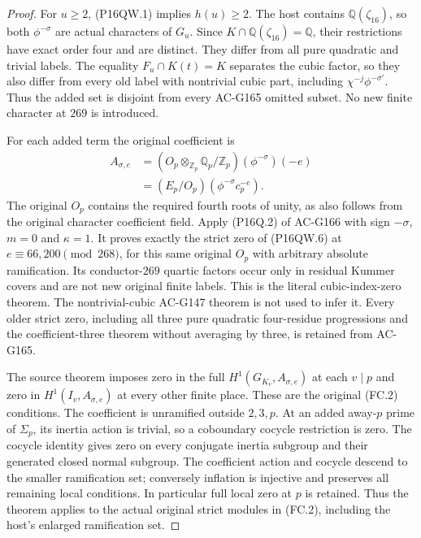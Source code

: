 \begin{proof}
For $u\geq2$, (P16QW.1) implies $h(u)\geq2$.
The host contains $\mathbb Q(\zeta_{16})$, so both
$\phi^{-\sigma}$ are actual characters of $G_u$.
Since $K\cap\mathbb Q(\zeta_{16})=\mathbb Q$, their restrictions
have exact order four and are distinct.  They differ from all
pure quadratic and trivial labels.  The equality
$F_u\cap K(t)=K$ separates the cubic factor, so they also differ
from every old label with nontrivial cubic part, including
$\chi^{-j}\phi^{-\sigma'}$.
Thus the added set is disjoint from every AC-G165 omitted subset.
No new finite character at $269$ is introduced.

For each added term the original coefficient is
\[
 \begin{aligned}
 A_{\sigma,e}&=(O_p\otimes_{\mathbb Z_p}\mathbb Q_p/\mathbb Z_p)
                                             (\phi^{-\sigma})(-e)\\
    &=(E_p/O_p)(\phi^{-\sigma}c_p^{-e}).
 \end{aligned}
 \tag{P16QW.6}
\]
The original $O_p$ contains the required fourth roots of unity,
as also follows from the original character coefficient field.
Apply (P16Q.2) of AC-G166 with sign $-\sigma$, $m=0$ and
$\kappa=1$.  It proves exactly the strict zero of (P16QW.6)
at $e\equiv66,200\pmod{268}$, for this same original $O_p$
with arbitrary absolute ramification.
Its conductor-$269$ quartic factors occur only in residual
Kummer covers and are not new original finite labels.
This is the literal cubic-index-zero theorem.  The nontrivial-cubic
AC-G147 theorem is not used to infer it.
Every older strict zero, including all three pure quadratic
four-residue progressions and the coefficient-three theorem
without averaging by three, is retained from AC-G165.

The source theorem imposes zero in the full
$H^1(G_{K_v},A_{\sigma,e})$ at each $v\mid p$ and zero in
$H^1(I_v,A_{\sigma,e})$ at every other finite place.
These are the original (FC.2) conditions.
The coefficient is unramified outside $2,3,p$.
At an added away-$p$ prime of $\Sigma_p$, its inertia action is
trivial, so a coboundary cocycle restriction is zero.
The cocycle identity gives zero on every conjugate inertia
subgroup and their generated closed normal subgroup.
The coefficient action and cocycle descend to the smaller
ramification set; conversely inflation is injective and preserves
all remaining local conditions.  In particular full local zero
at $p$ is retained.
Thus the theorem applies to the actual original strict modules
in (FC.2), including the host's enlarged ramification set.


\end{proof}
